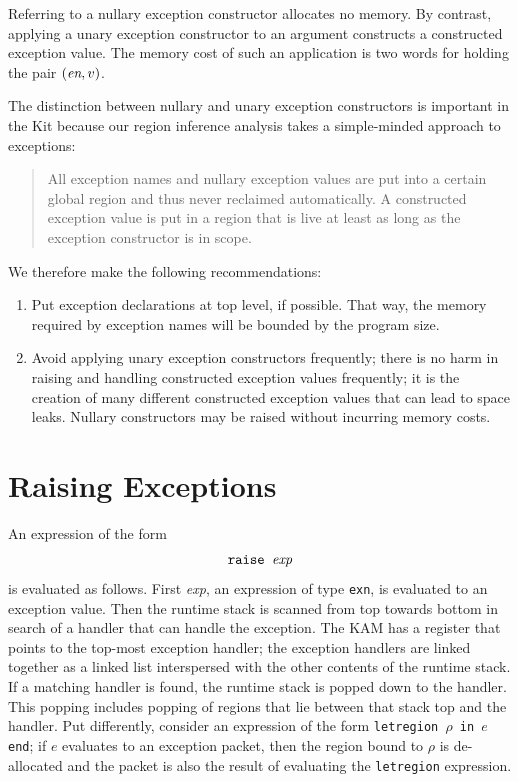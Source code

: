 \documentclass[12pt]{book}
\begin{document}
Referring to a nullary exception constructor allocates no memory. By
contrast, applying a unary exception constructor to an argument
constructs a constructed exception value. The memory cost of such an
application is two words for holding the pair $(\hbox{\it en}, v)$.

The distinction between nullary and unary exception constructors
is important in the Kit because our region inference analysis
takes a simple-minded approach to exceptions: 
\begin{quote}
  All exception names and nullary exception values are put into a
  certain
  global region and thus never reclaimed automatically. A constructed
  exception value is put in a region that is live at least as long as
  the exception constructor is in scope.
\end{quote}
We therefore make the following recommendations:
\begin{enumerate}
\item Put exception declarations at top level, if possible.  That way,
  the memory required by exception names will be bounded by the
  program size.
\item Avoid applying unary exception constructors frequently; there is
  no harm in raising and handling constructed exception values
  frequently; it is the creation of many different constructed
  exception values that can lead to space leaks. Nullary constructors
  may be raised without incurring memory costs.
\end{enumerate}

\section{Raising Exceptions}
An expression of the form 
$$\hbox{\tt raise {\it exp}}$$
is evaluated as follows. First {\it exp}, an expression of 
type {\tt exn}, is evaluated to an exception value. Then the runtime
stack is scanned from top towards bottom in search of a handler
that can handle the exception. The KAM has a register that points
to the top-most exception handler; the exception handlers are linked
together as a linked list interspersed with the other contents of
the runtime stack. If a matching handler is found, the runtime stack
is popped down to the handler. This popping includes popping of regions
that lie between that stack top and the handler. Put differently,
consider an expression of the form 
{\tt letregion $\rho$ in $e$ end}; if $e$ evaluates to an exception packet,
then the region bound to $\rho$ is de-allocated and the packet is also
the result of evaluating the \texttt{letregion} expression.
\end{document}
